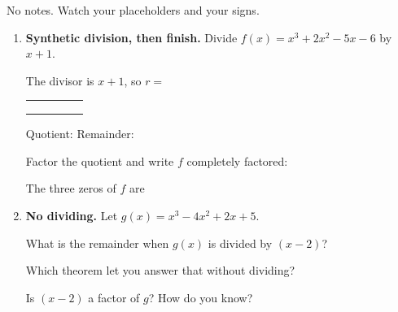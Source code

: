 \documentclass[10pt]{article}
\begin{document}
\namedateperiod

\vspace{0.10in}

No notes. Watch your placeholders and your signs.

\begin{enumerate}[leftmargin=1.8em, itemsep=12pt]
  \item \textbf{Synthetic division, then finish.} Divide $f(x) = x^3 + 2x^2 - 5x - 6$ by $x + 1$.

    \vspace{3pt}
    The divisor is $x+1$, so $r = $ 
    \begin{center}
    \renewcommand{\arraystretch}{1.6}
    \begin{tabular}{r|C{1.5cm}C{1.5cm}C{1.5cm}C{1.5cm}}
     &  &  &  &  \\
        &     &  &  &  \\ 
        &  &  &  &  \\
    \end{tabular}
    \end{center}

    \vspace{2pt}
    Quotient:  \quad Remainder: 

    \vspace{3pt}
    Factor the quotient and write $f$ completely factored: 

    \vspace{3pt}
    The three zeros of $f$ are 

  \item \textbf{No dividing.} Let $g(x) = x^3 - 4x^2 + 2x + 5$.

    \vspace{3pt}
    What is the remainder when $g(x)$ is divided by $(x - 2)$? 

    \vspace{3pt}
    Which theorem let you answer that without dividing? 

    \vspace{3pt}
    Is $(x-2)$ a factor of $g$?  \; How do you know? 


\end{enumerate}
\end{document}
